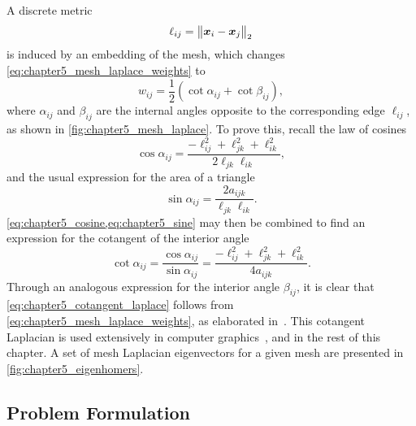 A discrete metric
%
\begin{equation}
	\ell_{i j}
	= {\big\lVert\vb*{x}_{i} - \vb*{x}_{j}\big\rVert}_{2}
\end{equation}
%
is induced by an embedding of the mesh, which changes \cref{eq:chapter5_mesh_laplace_weights} to
%
\begin{equation}\label{eq:chapter5_cotangent_laplace}
	w_{i j}
	= \frac{1}{2}(\cot{\alpha_{i j}} + \cot{\beta_{i j}}),
\end{equation}
%
where \(\alpha_{i j}\) and \(\beta_{i j}\) are the internal angles opposite to the corresponding edge \(\ell_{i j}\), as shown in \cref{fig:chapter5_mesh_laplace}.
To prove this, recall the law of cosines
%
\begin{equation}\label{eq:chapter5_cosine}
	\cos{\alpha_{i j}}
	= \frac{-\ell_{i j}^{2} + \ell_{j k}^{2} + \ell_{i k}^{2}}{2\ell_{j k}\ell_{i k}},
\end{equation}
%
and the usual expression for the area of a triangle
%
\begin{equation}\label{eq:chapter5_sine}
	\sin{\alpha_{i j}}
	= \frac{2a_{i j k}}{\ell_{j k} \ell_{i k}}.
\end{equation}
%
\cref{eq:chapter5_cosine,eq:chapter5_sine} may then be combined to find an expression for the cotangent of the interior angle
%
\begin{equation}
	\cot{\alpha_{i j}}
	= \frac{\cos{\alpha_{i j}}}{\sin{\alpha_{i j}}}
	= \frac{-\ell_{i j}^{2} + \ell_{j k}^{2} + \ell_{i k}^{2}}{4a_{i j k}}.
\end{equation}
%
Through an analogous expression for the interior angle \(\beta_{i j}\), it is clear that \cref{eq:chapter5_cotangent_laplace} follows from \cref{eq:chapter5_mesh_laplace_weights}, as elaborated in~\cite{Meyer2003}.
This cotangent Laplacian is used extensively in computer graphics~\cite{Pinkall1993}, and in the rest of this chapter.
A set of mesh Laplacian eigenvectors for a given mesh are presented in \cref{fig:chapter5_eigenhomers}.





\subsection{Problem Formulation}\label{sec:chapter5_problem_formulation}

